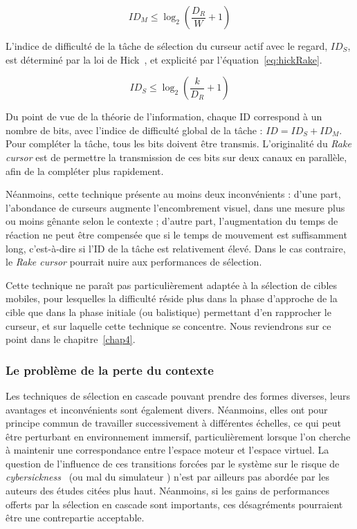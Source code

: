 	\begin{equation}
		\label{eq:fittsRake}
		ID_{M} \leq \log_2\left(\frac{D_{R}}{W} + 1 \right)
	\end{equation}
	
	L'indice de difficulté de la tâche de sélection du curseur actif avec le regard, $ID_{S}$, est déterminé par la loi de Hick~\cite{hick1952rate}, et explicité par l'équation~\ref{eq:hickRake}.
	
	\begin{equation}
		\label{eq:hickRake}
		ID_{S} \leq \log_2\left(\frac{k}{D_{R}} + 1 \right)
	\end{equation}
	
	Du point de vue de la théorie de l'information, chaque ID correspond à un nombre de bits, avec l'indice de difficulté global de la tâche : $ID = ID_{S} + ID_{M}$. Pour compléter la tâche, tous les bits doivent être transmis. L'originalité du \emph{Rake cursor} est de permettre la transmission de ces bits sur deux canaux en parallèle, afin de la compléter plus rapidement.
	
	Néanmoins, cette technique présente au moins deux inconvénients : d'une part, l'abondance de curseurs augmente l'encombrement visuel, dans une mesure plus ou moins gênante selon le contexte ; d'autre part, l'augmentation du temps de réaction ne peut être compensée que si le temps de mouvement est suffisamment long, c'est-à-dire si l'ID de la tâche est relativement élevé. Dans le cas contraire, le \emph{Rake cursor} pourrait nuire aux performances de sélection.
	
	Cette technique ne paraît pas particulièrement adaptée à la sélection de cibles mobiles, pour lesquelles la difficulté réside plus dans la phase d'approche de la cible que dans la phase initiale (ou balistique) permettant d'en rapprocher le curseur, et sur laquelle cette technique se concentre. Nous reviendrons sur ce point dans le chapitre~\ref{chap4}.
		 
	\subsubsection{Le problème de la perte du contexte}
	Les techniques de sélection en cascade pouvant prendre des formes diverses, leurs avantages et inconvénients sont également divers. Néanmoins, elles ont pour principe commun de travailler successivement à différentes échelles, ce qui peut être perturbant en environnement immersif, particulièrement lorsque l'on cherche à maintenir une correspondance entre l'espace moteur et l'espace virtuel. La question de l'influence de ces transitions forcées par le système sur le risque de \emph{cybersickness}~\cite{laviola2000discussion} (ou \og mal du simulateur \fg{}) n'est par ailleurs pas abordée par les auteurs des études citées plus haut. Néanmoins, si les gains de performances offerts par la sélection en cascade sont importants, ces désagréments pourraient être une contrepartie acceptable.
	
